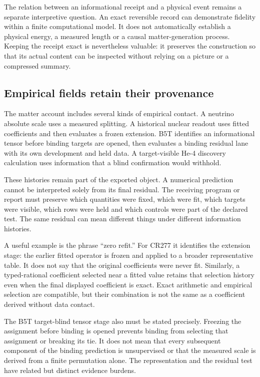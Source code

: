 The relation between an informational receipt and a physical event remains a separate interpretive question. An exact reversible record can demonstrate fidelity within a finite computational model. It does not automatically establish a physical energy, a measured length or a causal matter-generation process. Keeping the receipt exact is nevertheless valuable: it preserves the construction so that its actual content can be inspected without relying on a picture or a compressed summary.

\subsection{Empirical fields retain their provenance}

The matter account includes several kinds of empirical contact. A neutrino absolute scale uses a measured splitting. A historical nuclear readout uses fitted coefficients and then evaluates a frozen extension. B5T identifies an informational tensor before binding targets are opened, then evaluates a binding residual lane with its own development and held data. A target-visible He-4 discovery calculation uses information that a blind confirmation would withhold.

These histories remain part of the exported object. A numerical prediction cannot be interpreted solely from its final residual. The receiving program or report must preserve which quantities were fixed, which were fit, which targets were visible, which rows were held and which controls were part of the declared test. The same residual can mean different things under different information histories.

A useful example is the phrase ``zero refit.'' For CR277 it identifies the extension stage: the earlier fitted operator is frozen and applied to a broader representative table. It does not say that the original coefficients were never fit. Similarly, a typed-rational coefficient selected near a fitted value retains that selection history even when the final displayed coefficient is exact. Exact arithmetic and empirical selection are compatible, but their combination is not the same as a coefficient derived without data contact.

The B5T target-blind tensor stage also must be stated precisely. Freezing the assignment before binding is opened prevents binding from selecting that assignment or breaking its tie. It does not mean that every subsequent component of the binding prediction is unsupervised or that the measured scale is derived from a finite permutation alone. The representation and the residual test have related but distinct evidence burdens.

